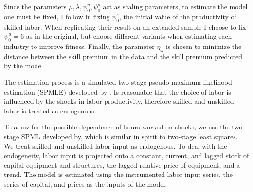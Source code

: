 \documentclass[12pt]{article}
\begin{document}
Since the parameters $\mu, \lambda, \psi^u_0, \psi^s_0$ act as scaling parameters, to estimate the model one must be fixed, I follow \citep{krusell2000capital} in fixing $\psi^s_0$, the initial value of the productivity of skilled labor. When replicating their result on an extended sample I choose to fix $\psi^u_0 = 6$ as in the original, but choose different variants when estimating each industry to improve fitness. Finally, the parameter $\eta_\omega$ is chosen to minimize the distance between the skill premium in the data and the skill premium predicted by the model.

The estimation process is a simulated two-stage pseudo-maximum likelihood estimation (SPMLE) developed by \citep{white1996estimation}. Is reasonable that the choice of labor is influenced by the shocks in labor productivity, therefore skilled and unskilled labor is treated as endogenous. 

To allow for the possible dependence of hours worked on shocks, we use the two-stage SPML developed by, which is similar in spirit to two-stage least squares. We treat skilled and unskilled labor input as endogenous. To deal with the endogeneity, labor input is projected onto a constant, current, and lagged stock of capital equipment and structures, the lagged relative price of equipment, and a trend. The model is estimated using the instrumented labor input series, the series of capital, and prices as the inputs of the model.
\end{document}
